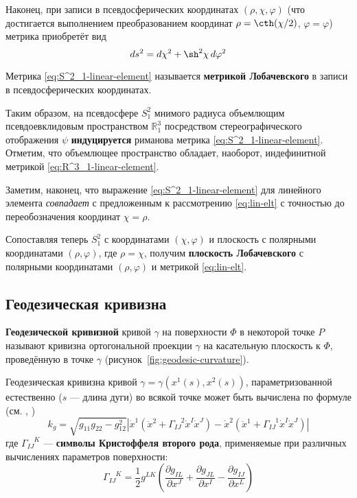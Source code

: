 \documentclass{article}
\numberwithin{equation}{section}
\renewcommand{\phi}{\varphi}
\newcommand{\krist}[3]{\Gamma^{\phantom{#1 #2}#3}_{#1 #2}}
\newcommand{\neword}[1]{\textbf{#1}}
\providecommand{\abs}[1]{\left \lvert{#1}\right \rvert}
\begin{document}
Наконец, при записи в псевдосферических координатах $(\rho, \chi, \phi)$
(что достигается выполнением преобразованием координат $\rho =
\cth(\chi/2)$, $\phi=\phi$) метрика приобретёт вид
\begin{equation}\label{eq:S^2_1-linear-element}
  ds^2 = d\chi^2 + \sh^2{\chi}\,d\phi^2
\end{equation}

Метрика \eqref{eq:S^2_1-linear-element} называется \neword{метрикой
  Лобачевского} в записи в псевдосферических координатах.

Таким образом, на псевдосфере $S^2_1$ мнимого радиуса объемлющим
псевдоевклидовым пространством $\mathbb{R}^3_1$ посредством
стереографического отображения $\psi$ \neword{индуцируется} риманова
метрика \eqref{eq:S^2_1-linear-element}. Отметим, что объемлющее
пространство обладает, наоборот, индефинитной метрикой
\eqref{eq:R^3_1-linear-element}.

Заметим, наконец, что выражение \eqref{eq:S^2_1-linear-element} для
линейного элемента \emph{совпадает} с предложенным к рассмотрению
\eqref{eq:lin-elt} с точностью до переобозначения координат $\chi =
\rho$.

Сопоставляя теперь $S^2_1$ с координатами $(\chi, \phi)$ и плоскость с
полярными координатами $(\rho, \phi)$, где $\rho=\chi$, получим
\neword{плоскость Лобачевского} с полярными координатами $(\rho,
\phi)$ и метрикой \eqref{eq:lin-elt}.

\subsection{Геодезическая кривизна}

\neword{Геодезической кривизной} кривой $\gamma$ на поверхности $\Phi$
в некоторой точке $P$ называют кривизна ортогональной проекции
$\gamma$ на касательную плоскость к $\Phi$, проведённую в точке
$\gamma$ (рисунок \ref{fig:geodesic-curvature}).



Геодезическая кривизна кривой $\gamma = \gamma(x^1(s), x^2(s))$,
параметризованной естественно ($s$ — длина дуги) во всякой точке может
быть вычислена по формуле (см. \cite{pogorelov74}, \cite{rashevsky50})
\begin{equation}
  k_g = \sqrt{g_{11} g_{22} - g_{12}^2}\abs{\dot{x}^1 (\ddot{x}^2 +
    \krist{I}{J}{2} \dot{x}^I \dot{x}^J) - \dot{x}^2 (\ddot{x}^1 +
    \krist{I}{J}{1} \dot{x}^I \dot{x}^J)}
\end{equation}
где $\krist{I}{J}{K}$ — \neword{символы Кристоффеля второго рода},
применяемые при различных вычислениях параметров поверхности:
\begin{equation}\label{eq:krist-generic}
  \krist{I}{J}{K} = \frac{1}{2} g^{LK} \left (
    \frac{\partial{g_{IL}}}{\partial{x^J}} +
    \frac{\partial{g_{JL}}}{\partial{x^I}} -
    \frac{\partial{g_{IJ}}}{\partial{x^L}} \right )
\end{equation}
\end{document}
